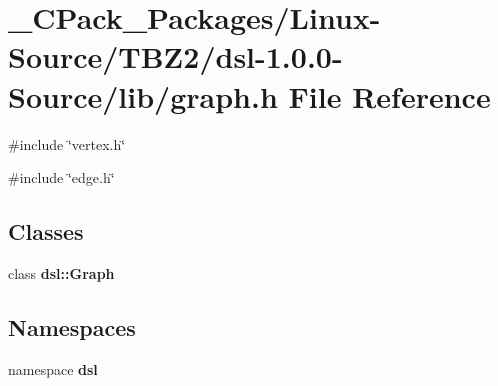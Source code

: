 \section{\_\-CPack\_\-Packages/Linux-\/Source/TBZ2/dsl-\/1.0.0-\/Source/lib/graph.h File Reference}
\label{__CPack__Packages_2Linux-Source_2TBZ2_2dsl-1_80_80-Source_2lib_2graph_8h}
{\ttfamily \#include \char`\"{}vertex.h\char`\"{}}\par
{\ttfamily \#include \char`\"{}edge.h\char`\"{}}\par
\subsection*{Classes}
\begin{DoxyCompactItemize}
\item 
class {\bf dsl::Graph}
\end{DoxyCompactItemize}
\subsection*{Namespaces}
\begin{DoxyCompactItemize}
\item 
namespace {\bf dsl}
\end{DoxyCompactItemize}
